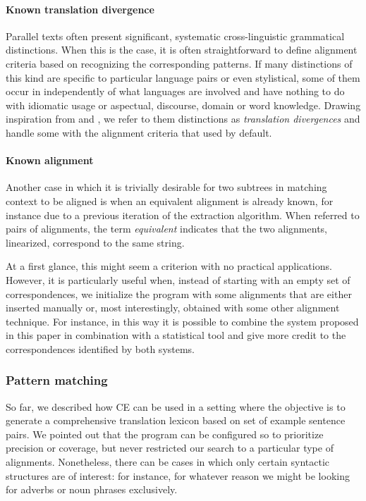 \documentclass[11pt]{article}
\begin{document}
\paragraph{Known translation divergence}
Parallel texts often present significant, systematic cross-linguistic grammatical distinctions. 
When this is the case, it is often straightforward to define alignment criteria based on recognizing the corresponding patterns.
If many distinctions of this kind are specific to particular language pairs or even stylistical, some of them occur in independently of what languages are involved and have nothing to do with idiomatic usage or aspectual, discourse, domain or word knowledge. Drawing inspiration from \cite{TODO:} and \cite{TODO:}, we refer to them distinctions as \textit{translation divergences} and handle some with the alignment criteria that used by default.


\paragraph{Known alignment}
Another case in which it is trivially desirable for two subtrees in matching context to be aligned is when an equivalent alignment is already known, for instance due to a previous iteration of the extraction algorithm. 
When referred to pairs of alignments, the term \textit{equivalent} indicates that the two alignments, linearized, correspond to the same string.

At a first glance, this might seem a criterion with no practical applications. 
However, it is particularly useful when, instead of starting with an empty set of correspondences, we initialize the program with some alignments that are either inserted manually or, most interestingly, obtained with some other alignment technique. 
For instance, in this way it is possible to combine the system proposed in this paper in combination with a statistical tool and give more credit to the correspondences identified by both systems.

\subsubsection{Pattern matching}
So far, we described how CE can be used in a setting where the objective is to generate a comprehensive translation lexicon based on set of example sentence pairs.
We pointed out that the program can be configured so to prioritize precision or coverage, but never restricted our search to a particular type of alignments.
Nonetheless, there can be cases in which only certain syntactic structures are of interest: for instance, for whatever reason we might be looking for adverbs or noun phrases exclusively.
\end{document}
